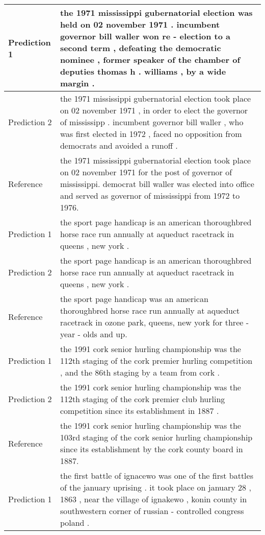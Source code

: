 \documentclass[11pt]{article}
\begin{document}
\begin{table*}[]
\centering
\begin{tabular}{l|p{13cm}}
\midrule[2pt]
Prediction 1 & the 1971 mississippi gubernatorial election was held on 02 november 1971 . incumbent governor bill waller won re - election to a second term , defeating the democratic nominee , former speaker of the chamber of deputies thomas h . williams , by a wide margin .              \\ \hline 
Prediction 2 & the 1971 mississippi gubernatorial election took place on 02 november 1971 , in order to elect the governor of mississipp . incumbent governor bill waller , who was first elected in 1972 , faced no opposition from democrats and avoided a runoff .              \\ \hline
Reference     & the 1971 mississippi gubernatorial election took place on 02 november 1971 for the post of governor of mississippi. democrat bill waller was elected into office and served as governor of mississippi from 1972 to 1976.                   \\ \midrule[2pt]
Prediction 1 & the sport page handicap is an american thoroughbred horse race run annually at aqueduct racetrack in queens , new york .                                     \\ \hline
Prediction 2 & the sport page handicap is an american thoroughbred horse race run annually at aqueduct racetrack in queens , new york .                                    \\ \hline
Reference     & the sport page handicap was an american thoroughbred horse race run annually at aqueduct racetrack in ozone park, queens, new york for three - year - olds and up.                         \\ \midrule[2pt]
Prediction 1 & the 1991 cork senior hurling championship was the 112th staging of the cork premier hurling competition , and the 86th staging by a team from cork .                         \\ \hline
Prediction 2 & the 1991 cork senior hurling championship was the 112th staging of the cork premier club hurling competition since its establishment in 1887 .                                                 \\ \hline
Reference     & the 1991 cork senior hurling championship was the 103rd staging of the cork senior hurling championship since its establishment by the cork county board in 1887.      \\ \midrule[2pt]
Prediction 1 & the first battle of ignacewo was one of the first battles of the january uprising . it took place on january 28 , 1863 , near the village of ignakewo , konin county in southwestern corner of russian - controlled congress poland .   \\ \hline

\end{tabular}
\end{table*}
\end{document}
